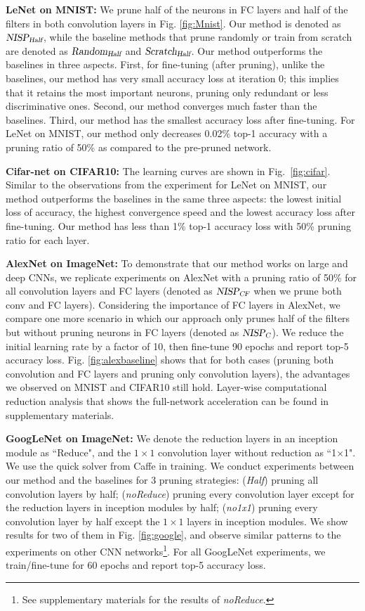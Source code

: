 \documentclass[10pt,twocolumn,letterpaper]{article}
\begin{document}
\textbf{LeNet on MNIST:}
We prune half of the neurons in FC layers and half of the filters in both convolution layers in Fig. \ref{fig:Mnist}. Our method is denoted as $\textsl{NISP}_\textsl{Half}$, while the baseline methods that prune randomly or train from scratch are denoted as $\textsl{Random}_\textsl{Half}$ and $\textsl{Scratch}_\textsl{Half}$. 
Our method outperforms the baselines in three aspects.
First, for fine-tuning (after pruning), unlike the baselines, our method has very small accuracy loss at iteration 0; this implies that it retains the most important neurons, pruning only redundant or less discriminative ones.
Second, our method converges much faster than the baselines.
Third, our method has the smallest accuracy loss after fine-tuning. 
For LeNet on MNIST, our method only decreases 0.02\% top-1 accuracy with a pruning ratio of 50\% as compared to the pre-pruned network.

\textbf{Cifar-net on CIFAR10:}
The learning curves are shown in Fig.~\ref{fig:cifar}. 
Similar to the observations from the experiment for LeNet on MNIST, our method outperforms the baselines in the same three aspects: the lowest initial loss of accuracy, the highest convergence speed and the lowest accuracy loss after fine-tuning. Our method has less than 1\% top-1 accuracy loss with 50\% pruning ratio for each layer.

\textbf{AlexNet on ImageNet:}
To demonstrate that our method works on large and deep CNNs, we replicate experiments on AlexNet with a pruning ratio of 50\% for all convolution layers and FC layers (denoted as {$\textsl{NISP}_\textsl{CF}$} when we prune both conv and FC layers). 
Considering the importance of FC layers in AlexNet, we compare one more scenario in which our approach only prunes half of the filters but without pruning neurons in FC layers (denoted as $\textsl{NISP}_\textsl{C}$).
We reduce the initial learning rate by a factor of 10, then fine-tune 90 epochs and report top-5 accuracy loss.
Fig. \ref{fig:alexbaseline} shows that for both cases (pruning both convolution and FC layers and pruning only convolution layers), the advantages we observed on MNIST and CIFAR10 still hold. 
Layer-wise computational reduction analysis that shows the full-network acceleration can be found in supplementary materials.

\textbf{GoogLeNet on ImageNet:}
We denote the reduction layers in an inception module as ``Reduce", and the $1 \times 1$ convolution layer without reduction as ``1$\times$1".
We use the quick solver from Caffe in training. 
We conduct experiments between our method and the baselines for 3 pruning strategies: (\textsl{Half}) pruning all convolution layers by half; (\textsl{noReduce}) pruning every convolution layer except for the reduction layers in inception modules by half; (\textsl{no1x1}) pruning every convolution layer  by half except the $1 \times 1$ layers in inception modules. We show results for two of them in Fig. \ref{fig:google}, and observe similar patterns to the experiments on other CNN networks\footnote{See supplementary materials for the results of \textsl{noReduce}.}. For all GoogLeNet experiments, we train/fine-tune for 60 epochs and report top-5 accuracy loss.
\end{document}
